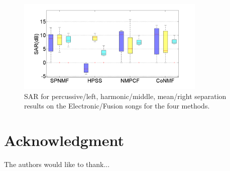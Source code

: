 \documentclass[journal]{IEEEtran}
\begin{document}
\begin{figure}[h]

  \centering 
  \includegraphics[width=9cm]{fig/ElectroFusionSAR.png}
  \caption{\label{ElectroFusionSAR} SAR for percussive/left, harmonic/middle, mean/right separation results on the Electronic/Fusion songs for the four methods.}
  
\end{figure}


\section*{Acknowledgment}


The authors would like to thank...


\ifCLASSOPTIONcaptionsoff
  \newpage
\fi




\end{document}
